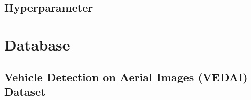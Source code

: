 \subsection{Hyperparameter}

\section{Database}
\subsection{Vehicle Detection on Aerial Images (VEDAI) Dataset}

